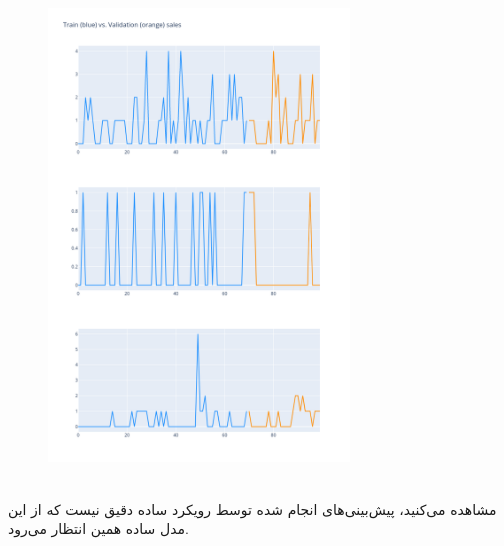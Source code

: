 \documentclass{article}
\begin{document}
\begin{figure}[hbt!]
	\centering
	\includegraphics[width=\textwidth,height=12cm]{Outputs/25.png}
\end{figure}
\ \\
مشاهده می‌کنید، پیش‌بینی‌های انجام شده توسط رویکرد ساده دقیق نیست که از این مدل ساده‌ همین انتظار می‌رود.
\end{document}
